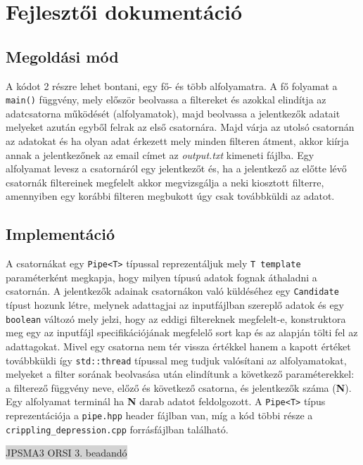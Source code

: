 \documentclass[12pt]{article}
\begin{document}
\section{Fejlesztői dokumentáció}

\subsection{Megoldási mód}

A kódot 2 részre lehet bontani, egy fő- és több alfolyamatra. A fő folyamat a \verb|main()|
függvény, mely először beolvassa a filtereket és azokkal elindítja az adatcsatorna működését
(alfolyamatok), majd beolvassa a jelentkezők adatait melyeket azután egyből felrak az első csatornára. Majd várja az utolsó csatornán
az adatokat és ha olyan adat érkezett mely minden filteren átment, akkor kiírja annak a
jelentkezőnek az email címet az \textit{output.txt} kimeneti fájlba.\br
Egy alfolyamat levesz a csatornáról egy jelentkezőt és, ha a jelentkező az előtte lévő
csatornák filtereinek megfelelt akkor megvizsgálja a neki kiosztott filterre, amennyiben
egy korábbi filteren megbukott úgy csak továbbküldi az adatot.

\subsection{Implementáció}
A csatornákat egy \verb|Pipe<T>| típussal reprezentáljuk mely \verb|T template| paraméterként
megkapja, hogy milyen típusú adatok fognak áthaladni a csatornán.
A jelentkezők adainak csatornákon való küldéséhez egy \verb|Candidate| típust hozunk létre, 
melynek adattagjai az inputfájlban szereplő adatok és egy \verb|boolean| változó mely jelzi,
hogy az eddigi filtereknek megfelelt-e, konstruktora meg egy az inputfájl specifikációjának
megfelelő sort kap és az alapján tölti fel az adattagokat. Mivel egy csatorna nem tér vissza
értékkel hanem a kapott értéket továbbküldi így \verb|std::thread| típussal meg tudjuk
valósítani az alfolyamatokat, melyeket a filter sorának beolvasása után elindítunk
a következő paraméterekkel: a filterező függvény neve, előző és következő csatorna, és
jelentkezők száma (\textbf{N}). Egy alfolyamat terminál ha \textbf{N} darab adatot feldolgozott.
A \verb|Pipe<T>| típus reprezentációja a \verb|pipe.hpp| header fájlban van, míg a kód többi
része a \verb|crippling_depression.cpp| forrásfájlban található.

\newpage
\thispagestyle{empty}
\begin{center}
	\colorbox{lightgray}{{\large JPSMA3} \hspace{4.3cm} {\large ORSI 3. beadandó} \hspace{5.7cm} \thepage}
\end{center}
\end{document}
